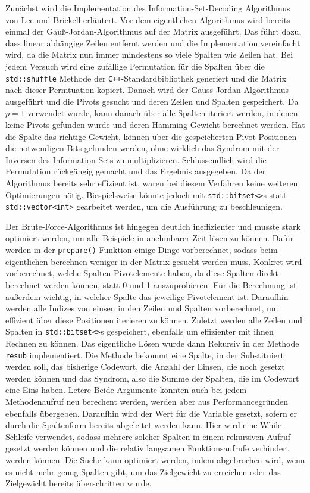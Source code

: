 \documentclass[a4paper,10pt,ngerman]{scrartcl}
\begin{document}
Zunächst wird die Implementation des Information-Set-Decoding Algorithmus von Lee und Brickell erläutert.
Vor dem eigentlichen Algorithmus wird bereits einmal der Gauß-Jordan-Algorithmus auf der Matrix ausgeführt. 
Das führt dazu, dass linear abhängige Zeilen entfernt werden und die Implementation vereinfacht wird, da die Matrix nun immer mindestens so viele Spalten wie Zeilen hat. 
Bei jedem Versuch wird eine zufällige Permutation für die Spalten über die \lstinline{std::shuffle} Methode der \texttt{C++}-Standardbibliothek generiert und die Matrix nach dieser Permtuation kopiert. 
Danach wird der Gauss-Jordan-Algorithmus ausgeführt und die Pivots gesucht und deren Zeilen und Spalten gespeichert. 
Da $p=1$ verwendet wurde, kann danach über alle Spalten iteriert werden, in denen keine Pivots gefunden wurde und deren Hamming-Gewicht berechnet werden. 
Hat die Spalte das richtige Gewicht, können über die gespeicherten Pivot-Positionen die notwendigen Bits gefunden werden, ohne wirklich das Syndrom mit der Inversen des Information-Sets zu multiplizieren.
Schlussendlich wird die Permutation rückgängig gemacht und das Ergebnis ausgegeben. 
Da der Algorithmus bereits sehr effizient ist, waren bei diesem Verfahren keine weiteren Optimierungen nötig. Biespielsweise könnte jedoch mit \lstinline{std::bitset<>}s statt \lstinline{std::vector<int>} gearbeitet werden, um die Ausführung zu beschleunigen.

Der Brute-Force-Algorithmus ist hingegen deutlich ineffizienter und musste stark optimiert werden, um alle Beispiele in anehmbarer Zeit lösen zu können. 
Dafür werden in der \lstinline{prepare()} Funktion einige Dinge vorberechnet, sodass beim eigentlichen berechnen weniger in der Matrix gesucht werden muss. 
Konkret wird vorberechnet, welche Spalten Pivotelemente haben, da diese Spalten direkt berechnet werden können, statt 0 und 1 auszuprobieren.  Für die Berechnung ist außerdem wichtig, in welcher Spalte das jeweilige Pivotelement ist. 
Daraufhin werden alle Indizes von einsen in den Zeilen und Spalten vorberechnet, um effizient über diese Positionen iterieren zu können. 
Zuletzt werden alle Zeilen und Spalten in \lstinline{std::bitset<>}s gespeichert, ebenfalls um effizienter mit ihnen Rechnen zu können.
Das eigentliche Lösen wurde dann Rekursiv in der Methode \lstinline{resub} implementiert.
Die Methode bekommt eine Spalte, in der Substituiert werden soll, das bisherige Codewort, die Anzahl der Einsen, die noch gesetzt werden können und das Syndrom, also die Summe der Spalten, die im Codewort eine Eins haben. 
Letere Beide Argumente könnten auch bei jedem Methodenaufruf neu berechent werden, werden aber aus Performancegründen ebenfalls übergeben. 
Daraufhin wird der Wert für die Variable gesetzt, sofern er durch die Spaltenform bereits abgeleitet werden kann. 
Hier wird eine While-Schleife verwendet, sodass mehrere solcher Spalten in einem rekursiven Aufruf gesetzt werden können und die relativ langsamen Funktionsaufrufe verhindert werden können.
Die Suche kann optimiert werden, indem abgebrochen wird, wenn es nicht mehr genug Spalten gibt, um das Zielgewicht zu erreichen oder das Zielgewicht bereits überschritten wurde. 
\end{document}
